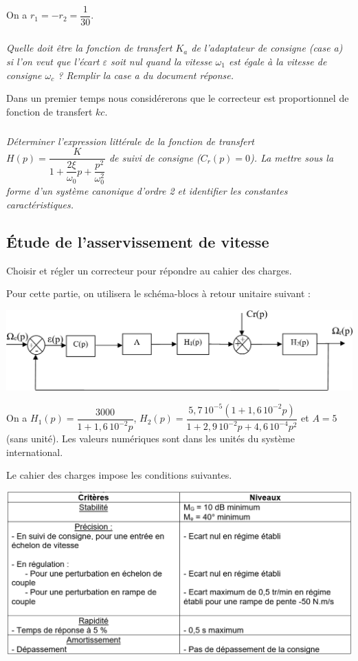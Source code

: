 \documentclass[10pt,fleqn]{article} %
\begin{document}
\begin{multicols}{2}
On a $r_1 = -r_2 = \dfrac{1}{30}$.
\subparagraph{}
\textit{Quelle doit être la fonction de transfert $K_a$ de l'adaptateur de consigne (case a) si l'on veut que l’écart $\varepsilon$ soit nul quand la vitesse $\omega_1$ est égale à la vitesse de consigne $\omega_c$ ? Remplir la case a du document réponse.}


Dans un premier temps nous considérerons que le correcteur est proportionnel de fonction de transfert $kc$.

\subparagraph{}
\textit{Déterminer l'expression littérale de la fonction de transfert  $H(p)=\dfrac{K}{1+\dfrac{2\xi}{\omega_0}p+\dfrac{p^2}{\omega_0^2}}$ de suivi de consigne ($C_r(p) = 0$). La mettre sous la forme d'un système canonique d'ordre 2 et identifier les constantes caractéristiques.}

\subsection*{Étude de l'asservissement de vitesse}

\begin{obj}
Choisir et régler un correcteur pour répondre au cahier des charges.
\end{obj}

Pour cette partie, on utilisera le schéma-blocs à retour unitaire suivant :
\begin{center}
\includegraphics[width=.8\linewidth]{images/e3a_06.png}
\end{center}

On a $H_1(p)=\dfrac{3000}{1+1,6\, 10^{-2}p}$, $H_2(p)=\dfrac{5,7\, 10^{-5}\left(1+ 1,6\, 10^{-2}p\right)}{1+2,9\, 10^{-2}p+4,6\, 10^{-4}p^2}$ et $A=5$ (sans unité). Les valeurs numériques sont dans les unités du système international.

Le cahier des charges impose les conditions suivantes. 
\begin{center}
\includegraphics[width=.8\linewidth]{images/e3a_07.png}
\end{center}


\end{multicols}
\end{document}
